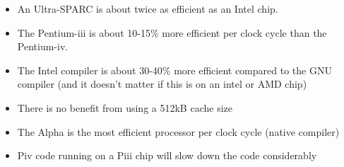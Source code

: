 \documentclass[11pt]{article}
\begin{document}
\begin{itemize}
\item An Ultra-SPARC is about twice as efficient as an Intel chip.

\item The Pentium-iii is about 10-15\% more efficient per clock cycle
than the Pentium-iv.

\item The Intel compiler is about 30-40\% more efficient compared
to the GNU compiler (and it doesn't matter if this is on an intel or AMD chip)

\item There is no benefit from using a 512kB cache size 

\item The Alpha is the most efficient processor per clock cycle (native compiler)

\item Piv code running on a Piii chip will slow down the code considerably

\end{itemize}
\end{document}
